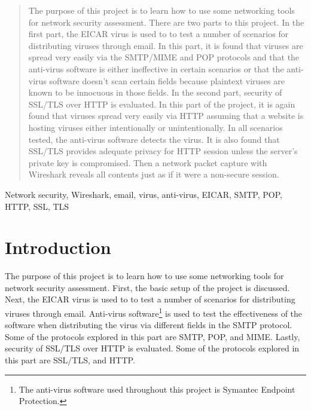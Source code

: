 \documentclass[10pt,conference]{IEEEtran}
\begin{document}
\maketitle

\begin{abstract}
The purpose of this project is to learn how to use some networking tools for network security assessment. There
are two parts to this project. In the first part, the EICAR virus is used to to test a number of scenarios for distributing
viruses through email. In this part, it is found that viruses are spread very easily via the SMTP/MIME and POP protocols and that
the anti-virus software is either ineffective in certain scenarios or that the anti-virus software doesn't scan certain fields
because plaintext viruses are known to be innocuous in those fields. In the second part, security of SSL/TLS over HTTP is evaluated.
In this part of the project, it is again found that viruses spread very easily via HTTP assuming that a website is hosting viruses
either intentionally or unintentionally. In all scenarios tested, the anti-virus software detects the virus. It is also found that
SSL/TLS provides adequate privacy for HTTP session unless the server's private key is compromised. Then a network packet capture
with Wireshark reveals all contents just as if it were a non-secure session. 
\end{abstract}

\begin{IEEEkeywords}
Network security, Wireshark, email, virus, anti-virus, EICAR, SMTP, POP, HTTP, SSL, TLS
\end{IEEEkeywords}



%
\IEEEpeerreviewmaketitle



\section{Introduction}
The purpose of this project is to learn how to use some networking tools for network security assessment. First, the basic setup
of the project is discussed. Next, the EICAR virus is used to to test a number of scenarios for distributing
viruses through email. Anti-virus software\footnote{The anti-virus software used throughout this project is Symantec Endpoint Protection.}
is used to test the effectiveness of the software when distributing the virus
via different fields in the SMTP protocol.  Some of the protocols explored in this part are SMTP, POP, and MIME. Lastly,
security of SSL/TLS over HTTP is evaluated. Some of the protocols explored in this part are SSL/TLS, and HTTP.
\end{document}

